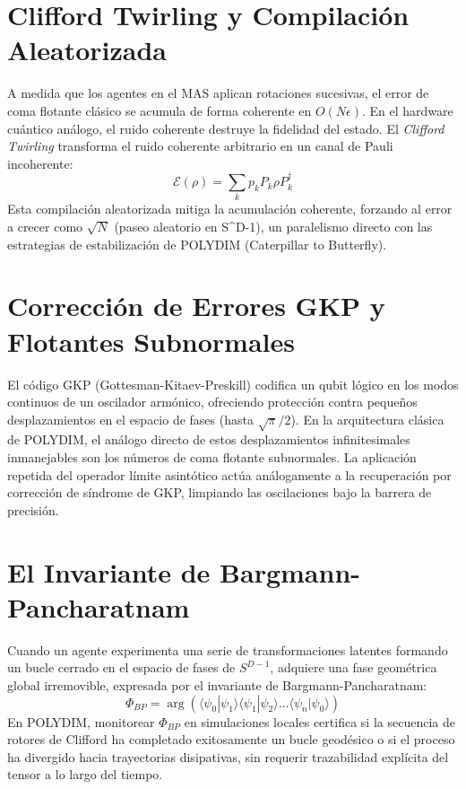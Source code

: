 \section{Clifford Twirling y Compilación Aleatorizada}
A medida que los agentes en el MAS aplican rotaciones sucesivas, el error de coma flotante clásico se acumula de forma coherente en $O(N \epsilon)$. En el hardware cuántico análogo, el ruido coherente destruye la fidelidad del estado.
El \emph{Clifford Twirling} transforma el ruido coherente arbitrario en un canal de Pauli incoherente:
\begin{equation}
    \mathcal{E}(\rho) = \sum_{k} p_k P_k \rho P_k^\dagger
\end{equation}
Esta compilación aleatorizada mitiga la acumulación coherente, forzando al error a crecer como $\sqrt{N}$ (paseo aleatorio en S^{D-1}), un paralelismo directo con las estrategias de estabilización de POLYDIM (Caterpillar to Butterfly).

\section{Corrección de Errores GKP y Flotantes Subnormales}
El código GKP (Gottesman-Kitaev-Preskill) codifica un qubit lógico en los modos continuos de un oscilador armónico, ofreciendo protección contra pequeños desplazamientos en el espacio de fases (hasta $\sqrt{\pi}/2$). En la arquitectura clásica de POLYDIM, el análogo directo de estos desplazamientos infinitesimales inmanejables son los números de coma flotante subnormales. La aplicación repetida del operador límite asintótico actúa análogamente a la recuperación por corrección de síndrome de GKP, limpiando las oscilaciones bajo la barrera de precisión.

\section{El Invariante de Bargmann-Pancharatnam}
Cuando un agente experimenta una serie de transformaciones latentes formando un bucle cerrado en el espacio de fases de $S^{D-1}$, adquiere una fase geométrica global irremovible, expresada por el invariante de Bargmann-Pancharatnam:
\begin{equation}
    \Phi_{BP} = \arg\left( \langle \psi_0 | \psi_1 \rangle \langle \psi_1 | \psi_2 \rangle \dots \langle \psi_n | \psi_0 \rangle \right)
\end{equation}
En POLYDIM, monitorear $\Phi_{BP}$ en simulaciones locales certifica si la secuencia de rotores de Clifford ha completado exitosamente un bucle geodésico o si el proceso ha divergido hacia trayectorias disipativas, sin requerir trazabilidad explícita del tensor a lo largo del tiempo.

